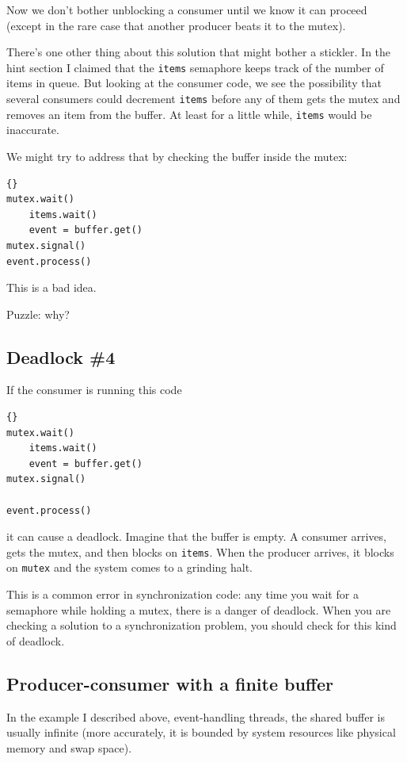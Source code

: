 \documentclass{book}
\newcommand{\clearemptydoublepage}{\newpage\cleardoublepage}
\begin{document}
Now we don't bother unblocking a consumer until we know it can proceed
(except in the rare case that another producer beats it to the mutex).

There's one other thing about this solution that might bother
a stickler.  In the hint section I claimed that the {\tt items}
semaphore keeps track of the number of items in queue.  But looking
at the consumer code, we see the possibility that several consumers
could decrement {\tt items} before any of them gets the mutex
and removes an item from the buffer.  At least for a little while,
{\tt items} would be inaccurate.

We might try to address that by checking the buffer inside the
mutex:

\begin{lstlisting}[caption={Broken consumer solution}]{}
mutex.wait()
    items.wait()
    event = buffer.get()
mutex.signal()
event.process()
\end{lstlisting}

This is a bad idea.

Puzzle: why?


\clearemptydoublepage
\subsection{Deadlock \#4}

If the consumer is running this code

\begin{lstlisting}[caption={Broken consumer solution}]{}
mutex.wait()
    items.wait()
    event = buffer.get()
mutex.signal()

event.process()
\end{lstlisting}
%
it can cause a deadlock.  Imagine that the buffer is empty.
A consumer arrives, gets the mutex, and then blocks on
{\tt items}.  When the producer arrives, it blocks on
{\tt mutex} and the system comes to a grinding halt.

This is a common error in synchronization code: any time
you wait for a semaphore while holding a mutex, there is
a danger of deadlock.  When you are checking a solution to
a synchronization problem, you should check for this kind
of deadlock.


\subsection{Producer-consumer with a finite buffer}

In the example I described above, event-handling threads,
the shared buffer is usually infinite (more accurately, it is
bounded by system resources like physical memory and swap
space).
\end{document}
